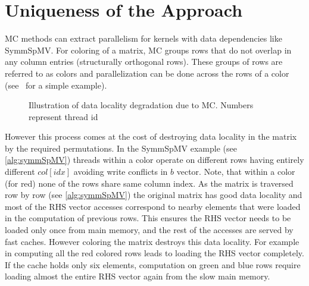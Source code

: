 \section{Uniqueness of the Approach} \label{sec:uniqueness}
\Acrlong{MC} methods can extract parallelism for kernels with data dependencies like \acrshort{SymmSpMV}. 
For \DTWO coloring of a matrix, \acrshort{MC}
groups rows that do not overlap in any column 
entries \cite{dist_k_def} (structurally orthogonal rows). These groups of rows are referred to as colors and parallelization can be done across the rows of a color (see~ for a simple example). 
\begin{figure}[tb]
	\centering
	\hspace{0.5em}
	\caption{\label{fig:mc_problem} Illustration of data locality degradation due to \acrshort{MC}.
		Numbers represent thread id}
\end{figure}
However this process comes at the cost of destroying data locality in the matrix by the required permutations. 
In the \acrshort{SymmSpMV} example (see \cref{alg:symmSpMV}) 
threads within a color operate on different rows having entirely different 
$col[idx]$ avoiding write conflicts in $b$ vector. 
Note, that within a color (for \eg red) none of the rows share same column index.
As the matrix is traversed row by row (see \cref{alg:symmSpMV}) the original matrix
has good data locality and most of the RHS vector accesses correspond to nearby elements 
that were loaded in the computation of previous rows.
This ensures the RHS vector needs to be loaded only
once from main memory, and the rest of the accesses are served by 
fast caches. However coloring the matrix destroys this data locality. For example
in  computing all the red colored rows leads to loading the 
RHS vector completely. If the cache holds only  six elements, 
computation on green and blue rows require loading almost the entire RHS vector again 
from the slow main memory.
